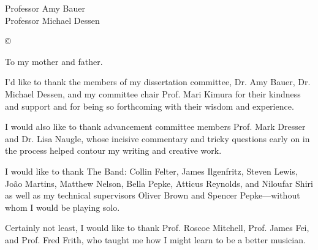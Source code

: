 




\othercommitteemembers
{
  Professor Amy Bauer\\
  Professor Michael Dessen
}


\copyrightdeclaration
{
  {\copyright} {\Degreeyear} \Authorname
}


\dedications
{
  To my mother and father.
}

\acknowledgments
{    
    I'd like to thank the members of my dissertation committee, Dr. Amy Bauer, Dr. Michael Dessen, and my committee chair Prof. Mari Kimura for their kindness and support and for being so forthcoming with their wisdom and experience.

    I would also like to thank advancement committee members Prof. Mark Dresser and Dr. Lisa Naugle, whose incisive commentary and tricky questions early on in the process helped contour my writing and creative work.

    I would like to thank The Band: Collin Felter, James Ilgenfritz, Steven Lewis, Jo\~{a}o Martins, Matthew Nelson, Bella Pepke, Atticus Reynolds, and Niloufar Shiri as well as my technical supervisors Oliver Brown and Spencer Pepke---without whom I would be playing solo. 

    Certainly not least, I would like to thank Prof. Roscoe Mitchell, Prof. James Fei, and Prof. Fred Frith, who taught me how I might learn to be a better musician.
}


